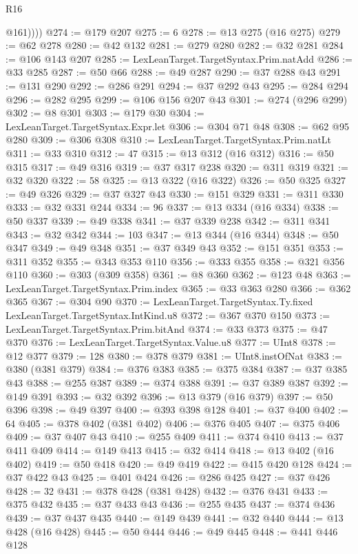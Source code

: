 \begin{lexlean}{R16}
\begin{coremodule}
            @161))))
@274 := @179 @207
@275 := 6
@278 := @13 @275 (@16 @275)
@279 := @62 @278
@280 := @42 @132
@281 := @279 @280
@282 := @32 @281
@284 := @106 @143 @207
@285 := LexLeanTarget.TargetSyntax.Prim.natAdd
@286 := @33 @285
@287 := @50 @66
@288 := @49 @287
@290 := @37 @288 @43
@291 := @131 @290
@292 := @286 @291
@294 := @37 @292 @43
@295 := @284 @294
@296 := @282 @295
@299 := @106 @156 @207 @43
@301 := @274 (@296 @299)
@302 := @8 @301
@303 := @179 @30
@304 := LexLeanTarget.TargetSyntax.Expr.let
@306 := @304 @71 @48
@308 := @62 @95 @280
@309 := @306 @308
@310 := LexLeanTarget.TargetSyntax.Prim.natLt
@311 := @33 @310
@312 := 47
@315 := @13 @312 (@16 @312)
@316 := @50 @315
@317 := @49 @316
@319 := @37 @317 @238
@320 := @311 @319
@321 := @32 @320
@322 := 58
@325 := @13 @322 (@16 @322)
@326 := @50 @325
@327 := @49 @326
@329 := @37 @327 @43
@330 := @151 @329
@331 := @311 @330
@333 := @32 @331 @244
@334 := 96
@337 := @13 @334 (@16 @334)
@338 := @50 @337
@339 := @49 @338
@341 := @37 @339 @238
@342 := @311 @341
@343 := @32 @342
@344 := 103
@347 := @13 @344 (@16 @344)
@348 := @50 @347
@349 := @49 @348
@351 := @37 @349 @43
@352 := @151 @351
@353 := @311 @352
@355 := @343 @353 @110
@356 := @333 @355
@358 := @321 @356 @110
@360 := @303 (@309 @358)
@361 := @8 @360
@362 := @123 @48
@363 := LexLeanTarget.TargetSyntax.Prim.index
@365 := @33 @363 @280
@366 := @362 @365
@367 := @304 @90
@370 := LexLeanTarget.TargetSyntax.Ty.fixed LexLeanTarget.TargetSyntax.IntKind.u8
@372 := @367 @370 @150
@373 := LexLeanTarget.TargetSyntax.Prim.bitAnd
@374 := @33 @373
@375 := @47 @370
@376 := LexLeanTarget.TargetSyntax.Value.u8
@377 := UInt8
@378 := @12 @377
@379 := 128
@380 := @378 @379
@381 := UInt8.instOfNat
@383 := @380 (@381 @379)
@384 := @376 @383
@385 := @375 @384
@387 := @37 @385 @43
@388 := @255 @387
@389 := @374 @388
@391 := @37 @389 @387
@392 := @149 @391
@393 := @32 @392
@396 := @13 @379 (@16 @379)
@397 := @50 @396
@398 := @49 @397
@400 := @393 @398 @128
@401 := @37 @400
@402 := 64
@405 := @378 @402 (@381 @402)
@406 := @376 @405
@407 := @375 @406
@409 := @37 @407 @43
@410 := @255 @409
@411 := @374 @410
@413 := @37 @411 @409
@414 := @149 @413
@415 := @32 @414
@418 := @13 @402 (@16 @402)
@419 := @50 @418
@420 := @49 @419
@422 := @415 @420 @128
@424 := @37 @422 @43
@425 := @401 @424
@426 := @286 @425
@427 := @37 @426
@428 := 32
@431 := @378 @428 (@381 @428)
@432 := @376 @431
@433 := @375 @432
@435 := @37 @433 @43
@436 := @255 @435
@437 := @374 @436
@439 := @37 @437 @435
@440 := @149 @439
@441 := @32 @440
@444 := @13 @428 (@16 @428)
@445 := @50 @444
@446 := @49 @445
@448 := @441 @446 @128

\end{coremodule}
\end{lexlean}
